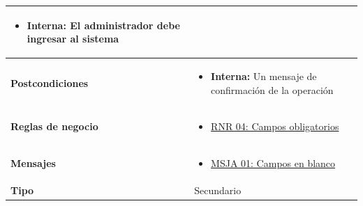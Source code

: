 \begin{center}
\begin{longtable}{| p{3.5cm} | p{11.5cm} |}
\begin{itemize}
                \item \textbf{Interna:} El administrador debe ingresar al sistema
              \end{itemize} \\
        \hline  
          \textbf{Postcondiciones} &
              \begin{itemize}
                \item \textbf{Interna:} Un mensaje de confirmación de la operación
              \end{itemize} \\
        \hline
          \textbf{Reglas de negocio} &
              \begin{itemize}
                 \item {\hyperref[rnr_04]{RNR 04: Campos obligatorios}}
              \end{itemize} \\
        \hline
          \textbf{Mensajes} &
              \begin{itemize}
                 \item {\hyperref[msja_01]{MSJA 01: Campos en blanco}}
              \end{itemize} \\
        \hline
          \textbf{Tipo} & Secundario\\
        \hline      
  \end{longtable}
\end{center}
\endgroup

